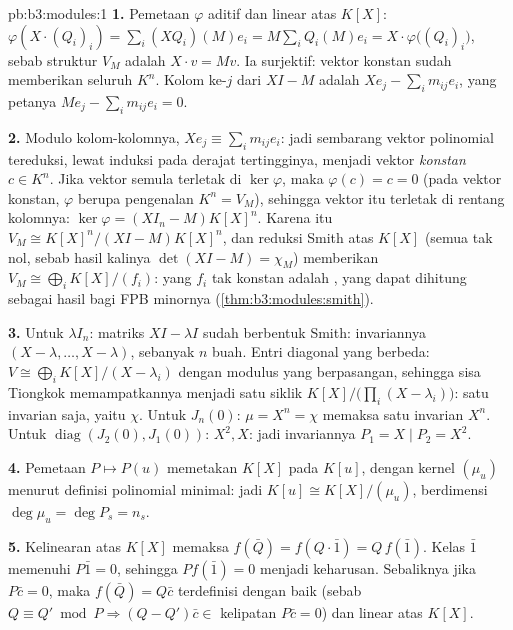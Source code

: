 \begin{solution}{pb:b3:modules:1}
\textbf{1.} Pemetaan $\varphi$ aditif dan linear atas $K[X]$: $\varphi(X
\cdot (Q_i)_i) = \sum_i (XQ_i)(M)e_i = M\sum_i Q_i(M)e_i = X
\cdot \varphi\bigl((Q_i)_i\bigr)$, sebab struktur  $V_M$
adalah $X \cdot v = Mv$. Ia surjektif: vektor konstan sudah memberikan
seluruh $K^n$. Kolom ke-$j$ dari $XI - M$ adalah $Xe_j - \sum_i
m_{ij}e_i$, yang petanya $Me_j - \sum_i m_{ij}e_i = 0$.

\textbf{2.} Modulo kolom-kolomnya, $Xe_j \equiv \sum_i m_{ij}e_i$:
jadi sembarang vektor polinomial tereduksi, lewat induksi pada derajat
tertingginya, menjadi vektor \emph{konstan} $c \in K^n$. Jika vektor
semula terletak di $\ker\varphi$, maka $\varphi(c) = c = 0$ (pada
vektor konstan, $\varphi$ berupa pengenalan $K^n = V_M$), sehingga
vektor itu terletak di rentang kolomnya: $\ker\varphi = (XI_n -
M)K[X]^n$. Karena itu $V_M \cong K[X]^n/(XI - M)K[X]^n$, dan reduksi Smith
atas $K[X]$ (semua  tak nol, sebab hasil kalinya
$\det(XI - M) = \chi_M$) memberikan $V_M \cong \bigoplus_i
K[X]/(f_i)$: yang $f_i$ tak konstan adalah , yang dapat dihitung sebagai hasil bagi FPB minornya
(\cref{thm:b3:modules:smith}).

\textbf{3.} Untuk $\lambda I_n$: matriks $XI - \lambda I$ sudah berbentuk Smith:
invariannya $(X - \lambda, \dots, X - \lambda)$, sebanyak $n$ buah.
Entri diagonal yang berbeda: $V \cong \bigoplus_i K[X]/(X -
\lambda_i)$ dengan modulus yang  berpasangan, sehingga sisa Tiongkok memampatkannya menjadi
satu  siklik $K[X]/\bigl(\prod_i(X - \lambda_i)\bigr)$:
satu invarian saja, yaitu $\chi$. Untuk $J_n(0)$: $\mu = X^n = \chi$ memaksa
satu invarian $X^n$. Untuk $\operatorname{diag}(J_2(0), J_1(0))$:
 $X^2, X$: jadi invariannya $P_1 = X \mid P_2 =
X^2$.

\textbf{4.} Pemetaan $P \mapsto P(u)$ memetakan $K[X]$ pada $K[u]$, dengan
kernel $(\mu_u)$ menurut definisi polinomial minimal: jadi $K[u]
\cong K[X]/(\mu_u)$, berdimensi $\deg\mu_u = \deg P_s = n_s$.

\textbf{5.} Kelinearan atas $K[X]$ memaksa $f(\bar Q) = f(Q\cdot\bar 1)
= Q\,f(\bar 1)$. Kelas $\bar 1$ memenuhi $P \bar 1 = 0$, sehingga
$P f(\bar 1) = 0$ menjadi keharusan. Sebaliknya jika $P\bar c = 0$,
maka $f(\bar Q) = Q\bar c$ terdefinisi dengan baik (sebab $Q \equiv Q' \bmod P
\Rightarrow (Q - Q')\bar c \in$ kelipatan $P\bar c = 0$) dan
linear atas $K[X]$.


\end{solution}
